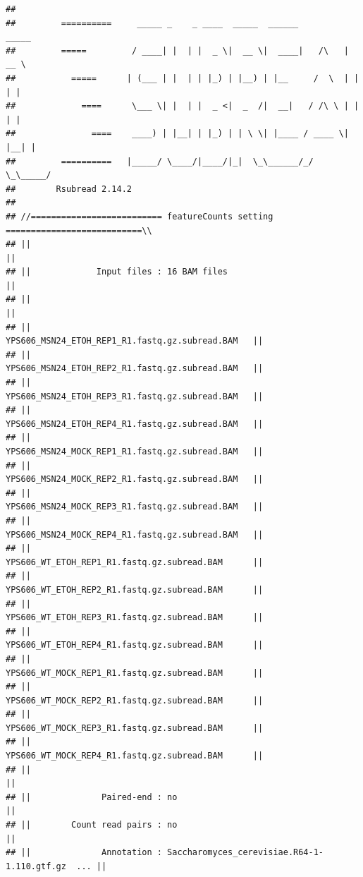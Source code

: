 \documentclass[
]{book}
\begin{document}
\begin{verbatim}
## 
##         ==========     _____ _    _ ____  _____  ______          _____  
##         =====         / ____| |  | |  _ \|  __ \|  ____|   /\   |  __ \ 
##           =====      | (___ | |  | | |_) | |__) | |__     /  \  | |  | |
##             ====      \___ \| |  | |  _ <|  _  /|  __|   / /\ \ | |  | |
##               ====    ____) | |__| | |_) | | \ \| |____ / ____ \| |__| |
##         ==========   |_____/ \____/|____/|_|  \_\______/_/    \_\_____/
##        Rsubread 2.14.2
## 
## //========================== featureCounts setting ===========================\\
## ||                                                                            ||
## ||             Input files : 16 BAM files                                     ||
## ||                                                                            ||
## ||                           YPS606_MSN24_ETOH_REP1_R1.fastq.gz.subread.BAM   ||
## ||                           YPS606_MSN24_ETOH_REP2_R1.fastq.gz.subread.BAM   ||
## ||                           YPS606_MSN24_ETOH_REP3_R1.fastq.gz.subread.BAM   ||
## ||                           YPS606_MSN24_ETOH_REP4_R1.fastq.gz.subread.BAM   ||
## ||                           YPS606_MSN24_MOCK_REP1_R1.fastq.gz.subread.BAM   ||
## ||                           YPS606_MSN24_MOCK_REP2_R1.fastq.gz.subread.BAM   ||
## ||                           YPS606_MSN24_MOCK_REP3_R1.fastq.gz.subread.BAM   ||
## ||                           YPS606_MSN24_MOCK_REP4_R1.fastq.gz.subread.BAM   ||
## ||                           YPS606_WT_ETOH_REP1_R1.fastq.gz.subread.BAM      ||
## ||                           YPS606_WT_ETOH_REP2_R1.fastq.gz.subread.BAM      ||
## ||                           YPS606_WT_ETOH_REP3_R1.fastq.gz.subread.BAM      ||
## ||                           YPS606_WT_ETOH_REP4_R1.fastq.gz.subread.BAM      ||
## ||                           YPS606_WT_MOCK_REP1_R1.fastq.gz.subread.BAM      ||
## ||                           YPS606_WT_MOCK_REP2_R1.fastq.gz.subread.BAM      ||
## ||                           YPS606_WT_MOCK_REP3_R1.fastq.gz.subread.BAM      ||
## ||                           YPS606_WT_MOCK_REP4_R1.fastq.gz.subread.BAM      ||
## ||                                                                            ||
## ||              Paired-end : no                                               ||
## ||        Count read pairs : no                                               ||
## ||              Annotation : Saccharomyces_cerevisiae.R64-1-1.110.gtf.gz  ... ||

\end{verbatim}
\end{document}
